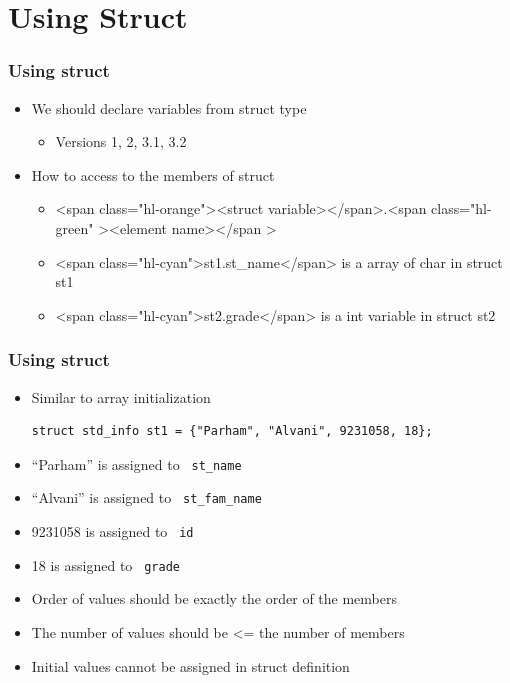 \documentclass{../c-lecture}
\begin{document}
\section{Using Struct}

\begin{frame}
  \frametitle{Using struct}
  \begin{itemize}
    \item We should declare variables from struct type
    \begin{itemize}
      \item Versions 1, 2, 3.1, 3.2
    \end{itemize}
    \item How to access to the members of struct
    \begin{itemize}
      \item
        <span class="hl-orange"><struct variable></span>.<span
          class="hl-green"
          ><element name></span
        >
      \item
        <span class="hl-cyan">st1.st\_name</span> is a array of char in struct
        st1
      \item
        <span class="hl-cyan">st2.grade</span> is a int variable in struct st2
    \end{itemize}
  \end{itemize}
\end{frame}

\begin{frame}[fragile]
  \frametitle{Using struct}
  \begin{itemize}
    \item Similar to array initialization
    \begin{verbatim}
struct std_info st1 = {"Parham", "Alvani", 9231058, 18};
    \end{verbatim}
    \item
      {\color{Orange} ``Parham''} is assigned to
      \texttt{\color{LimeGreen} st\_name}

    \item
      {\color{Orange} ``Alvani''} is assigned to
      \texttt{\color{LimeGreen} st\_fam\_name}

    \item
      {\color{Orange} 9231058} is assigned to
      \texttt{\color{LimeGreen} id}

    \item
      {\color{Orange} 18} is assigned to
      \texttt{\color{LimeGreen} grade}
  \end{itemize}

  \begin{block}{}
    \begin{itemize}
      \item Order of values should be exactly the order of the members
      \item The number of values should be <= the number of members
      \item Initial values cannot be assigned in struct definition
    \end{itemize}
  \end{block}
\end{frame}
\end{document}
